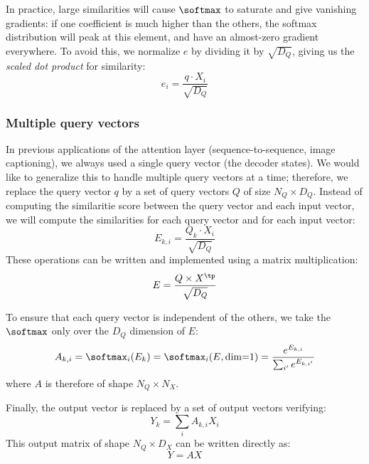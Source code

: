 In practice, large similarities will cause $\softmax$ to saturate and give vanishing gradients: if one coefficient is much higher than the others, the softmax distribution will peak at this element, and have an almost-zero gradient everywhere. To avoid this, we normalize $e$ by dividing it by $\sqrt{D_Q}$, giving us the \emph{scaled dot product} for similarity:
\begin{equation*}
    e_i = \frac{q\cdot X_i}{\sqrt{D_Q}}
\end{equation*}

\subsubsection{Multiple query vectors}
In previous applications of the attention layer (sequence-to-sequence, image captioning), we always used a single query vector (the decoder states). We would like to generalize this to handle multiple query vectors at a time; therefore, we replace the query vector $q$ by a set of query vectors $Q$ of size $N_Q\times D_Q$. Instead of computing the similaritie score between the query vector and each input vector, we will compute the similarities for each query vector and for each input vector:
\begin{equation*}
    E_{k,i} = \frac{Q_k\cdot X_i}{\sqrt{D_Q}}
\end{equation*}
These operations can be written and implemented using a matrix multiplication:
\begin{equation}
    E = \frac{Q\times X^\tp}{\sqrt{D_Q}}
    \label{eq:similarity-matrix}
\end{equation}

To ensure that each query vector is independent of the others, we take the $\softmax$ only over the $D_Q$ dimension of $E$:
\begin{equation*}
    A_{k,i} = \softmax_i(E_k) = \softmax_i(E, \textnormal{dim=1}) = \frac{e^{E_{k,i}}}{\sum_{i'}e^{E_{k,i'}}}
\end{equation*}
where $A$ is therefore of shape $N_Q\times N_X$.

Finally, the output vector is replaced by a set of output vectors verifying:
\begin{equation*}
    Y_k = \sum_i A_{k,i}X_i
\end{equation*}
This output matrix of shape $N_Q\times D_X$ can be written directly as:
\begin{equation}
    Y = AX 
    \label{eq:output-matrix}
\end{equation}

